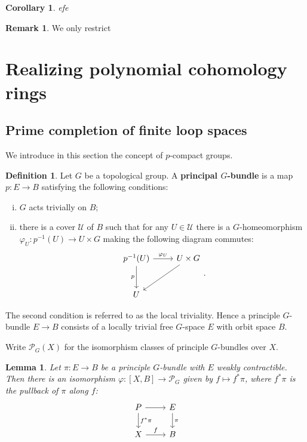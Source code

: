 \documentclass[psamsfonts]{amsart}
\newtheorem{cor}{Corollary}[section]
\newtheorem{lem}{Lemma}[section]
\theoremstyle{definition}
\newtheorem{defn}{Definition}[section]
\newtheorem{rem}{Remark}[section]
\numberwithin{equation}{section}
\begin{document}
\begin{cor}
efe
\end{cor}

\begin{rem}
We only restrict
\end{rem}


\section{Realizing polynomial cohomology rings}

\subsection{Prime completion of finite loop spaces} We introduce in this section the concept of $p$-compact groups.

\begin{defn}
Let $G$ be a topological group. A \textbf{principal $G$-bundle} is a map $p:E\to B$ satisfying the following conditions:\begin{enumerate}[(i)]
    \item $G$ acts trivially on $B$;
    \item there is a cover $\mathcal{U}$ of $B$ such that for any $U\in\mathcal{U}$ there is a $G$-homeomorphism $\varphi_U:p^{-1}(U)\to U\times G$ making the following diagram commutes:
    \[\begin{tikzcd}[row sep=large]
p^{-1}(U)\arrow[d,"p"']\arrow[r,"\varphi_U"]&U\times G\arrow[dl]\\
U
\end{tikzcd}.\]
\end{enumerate}
The second condition is referred to as the local triviality. Hence a principle $G$-bundle $E\to B$ consists of a locally trivial free $G$-space $E$ with orbit space $B$.
\end{defn}

Write $\mathcal{P}_G(X)$ for the isomorphism classes of principle $G$-bundles over $X$.

\begin{lem}
Let $\pi:E\to B$ be a principle $G$-bundle with $E$ weakly contractible. Then there is an isomorphism $\varphi:[X,B]\to\mathcal{P}_G$ given by $f\mapsto f^\ast\pi$, where $f^\ast\pi$ is the pullback of $\pi$ along $f$:
\[\begin{tikzcd}
P\arrow[r]\arrow[d,"f^\ast\pi"]&E\arrow[d,"\pi"]\\
X\arrow[r,"f"]&B
\end{tikzcd}\]
\end{lem}
\end{document}
